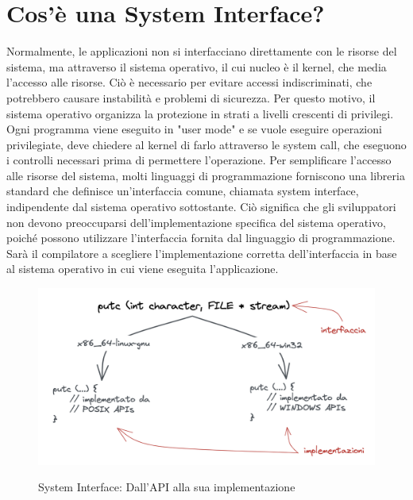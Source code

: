 \section{Cos'è una System Interface?}
Normalmente, le applicazioni non si interfacciano direttamente con le risorse del sistema, ma attraverso il sistema operativo, il cui nucleo è il kernel, che media l'accesso alle risorse. Ciò è necessario per evitare accessi indiscriminati, che potrebbero causare instabilità e problemi di sicurezza. Per questo motivo, il sistema operativo organizza la protezione in strati a livelli crescenti di privilegi. Ogni programma viene eseguito in "user mode" e se vuole eseguire operazioni privilegiate, deve chiedere al kernel di farlo attraverso le system call, che eseguono i controlli necessari prima di permettere l'operazione.
Per semplificare l'accesso alle risorse del sistema, molti linguaggi di programmazione forniscono una libreria standard che definisce un'interfaccia comune, chiamata system interface, indipendente dal sistema operativo sottostante. Ciò significa che gli sviluppatori non devono preoccuparsi dell'implementazione specifica del sistema operativo, poiché possono utilizzare l'interfaccia fornita dal linguaggio di programmazione. Sarà il compilatore a scegliere l'implementazione corretta dell'interfaccia in base al sistema operativo in cui viene eseguita l'applicazione.
\begin{figure}[h]
    \centering
    \captionsetup{justification=centering}
    \includegraphics[width=15cm]{./images/5.system-interface-api-to-impl.png}
    \label{system-interface-api-to-impl}
    \caption{System Interface: Dall'API alla sua implementazione}
\end{figure}


